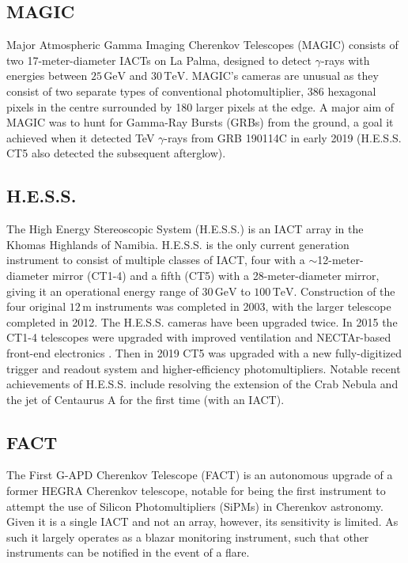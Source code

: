 \subsection{MAGIC}
Major Atmospheric Gamma Imaging Cherenkov Telescopes (MAGIC) consists of two 17-meter-diameter IACTs on La Palma, designed to detect $\gamma$-rays with energies between $\mathrm{25\,GeV}$ and $\mathrm{30\,TeV}$. MAGIC's cameras are unusual as they consist of two separate types of conventional photomultiplier, 386 hexagonal pixels in the centre surrounded by 180 larger pixels at the edge. A major aim of MAGIC was to hunt for Gamma-Ray Bursts (GRBs) from the ground, a goal it achieved when it detected TeV $\gamma$-rays from GRB 190114C in early 2019 \cite{magicGRB} (H.E.S.S. CT5 also detected the subsequent afterglow).

\subsection{H.E.S.S.}
The High Energy Stereoscopic System (H.E.S.S.) is an IACT array in the Khomas Highlands of Namibia. H.E.S.S. is the only current generation instrument to consist of multiple classes of IACT, four with a $\sim$12-meter-diameter mirror (CT1-4) and a fifth (CT5) with a 28-meter-diameter mirror, giving it an operational energy range of $\mathrm{30\,GeV}$ to $\mathrm{100\,TeV}$. Construction of the four original $\mathrm{12\,m}$ instruments was completed in 2003, with the larger telescope completed in 2012. The H.E.S.S. cameras have been upgraded twice. In 2015 the CT1-4 telescopes were upgraded with improved ventilation and NECTAr-based front-end electronics \cite{hess1u}. Then in 2019 CT5 was upgraded with a new fully-digitized trigger and readout system and higher-efficiency photomultipliers. Notable recent achievements of H.E.S.S. include resolving the extension of the Crab Nebula \cite{crabextension} and the jet of Centaurus A \cite{cena} for the first time (with an IACT).

\subsection{FACT}
The First G-APD Cherenkov Telescope (FACT) is an autonomous upgrade of a former HEGRA Cherenkov telescope, notable for being the first instrument to attempt the use of Silicon Photomultipliers (SiPMs) in Cherenkov astronomy. Given it is a single IACT and not an array, however, its sensitivity is limited. As such it largely operates as a blazar monitoring instrument, such that other instruments can be notified in the event of a flare. 

